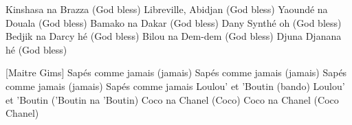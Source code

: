\begin{guitar}
Kinshasa na Brazza (God bless)
Libreville, Abidjan (God bless)
Yaoundé na Douala (God bless)
Bamako na Dakar (God bless)
Dany Synthé oh (God bless)
Bedjik na Darcy hé (God bless)
Bilou na Dem-dem (God bless)
Djuna Djanana hé (God bless)

[Maitre Gims]
Sapés comme jamais (jamais)
Sapés comme jamais (jamais)
Sapés comme jamais (jamais)
Sapés comme jamais
Loulou' et 'Boutin (bando)
Loulou' et 'Boutin ('Boutin na 'Boutin)
Coco na Chanel (Coco)
Coco na Chanel (Coco Chanel)


\end{guitar}